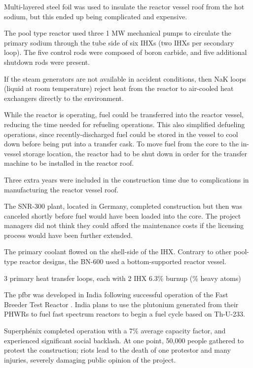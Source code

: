 \documentclass[10pt]{article}
\newcounter{subsubsubsection}[subsubsection]
\numberwithin{equation}{section} %
\begin{document}
Multi-layered steel foil was used to insulate the reactor vessel roof from the hot sodium, but this ended up being complicated and expensive. 

The pool type reactor used three 1 MW mechanical pumps to circulate the primary sodium through the tube side of six IHXs (two IHXs per secondary loop). The five control rods were composed of boron carbide, and five additional shutdown rods were present. 

If the steam generators are not available in accident conditions, then NaK loops (liquid at room temperature) reject heat from the reactor to air-cooled heat exchangers directly to the environment. 

While the reactor is operating, fuel could be transferred into the reactor vessel, reducing the time needed for refueling operations. This also simplified defueling operations, since recently-discharged fuel could be stored in the vessel to cool down before being put into a transfer cask. To move fuel from the core to the in-vessel storage location, the reactor had to be shut down in order for the transfer machine to be installed in the reactor roof. 

Three extra years were included in the construction time due to complications in manufacturing the reactor vessel roof. 


The SNR-300 plant, located in Germany, completed construction but then was canceled shortly before fuel would have been loaded into the core. The project managers did not think they could afford the maintenance costs if the licensing process would have been further extended. 


The primary coolant flowed on the shell-side of the IHX. Contrary to other pool-type reactor designs, the BN-600 used a bottom-supported reactor vessel. 

3 primary heat transfer loops, each with 2 IHX
6.3\% burnup (\% heavy atoms)



The \gls{pfbr} was developed in India following successful operation of the Fast Breeder Test Reactor \cite{pfbr, pfbrTH}. India plans to use the plutonium generated from their PHWRs to fuel fast spectrum reactors to begin a fuel cycle based on Th-U-233. 



Superph\'{e}nix completed operation with a 7\% average capacity factor, and experienced significant social backlash. At one point, 50,000 people gathered to protest the construction; riots lead to the death of one protestor and many injuries, severely damaging public opinion of the project. 
\end{document}

